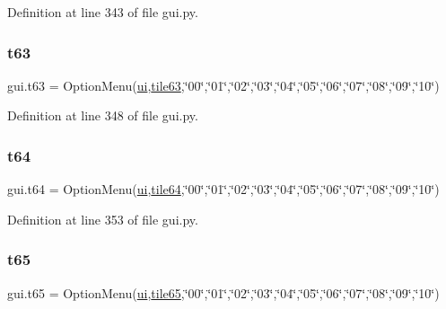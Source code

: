 Definition at line 343 of file gui.\+py.

\mbox{\label{namespacegui_a1aa84116c728e10eee4388bb757714c3}} 
\subsubsection{\texorpdfstring{t63}{t63}}
{\footnotesize\ttfamily gui.\+t63 = Option\+Menu(\mbox{\hyperlink{namespacegui_a40ab7281456eadbea2dc2038f5c24fa1}{ui}},\mbox{\hyperlink{namespacegui_ad42c2e1d85c862f7218f07791aad0d8a}{tile63}},\char`\"{}00\char`\"{},\char`\"{}01\char`\"{},\char`\"{}02\char`\"{},\char`\"{}03\char`\"{},\char`\"{}04\char`\"{},\char`\"{}05\char`\"{},\char`\"{}06\char`\"{},\char`\"{}07\char`\"{},\char`\"{}08\char`\"{},\char`\"{}09\char`\"{},\char`\"{}10\char`\"{})}



Definition at line 348 of file gui.\+py.

\mbox{\label{namespacegui_a153819d784faac94130fb5aa11c944d7}} 
\subsubsection{\texorpdfstring{t64}{t64}}
{\footnotesize\ttfamily gui.\+t64 = Option\+Menu(\mbox{\hyperlink{namespacegui_a40ab7281456eadbea2dc2038f5c24fa1}{ui}},\mbox{\hyperlink{namespacegui_a19cdc2ff759a4ddb510a64dee3011d9c}{tile64}},\char`\"{}00\char`\"{},\char`\"{}01\char`\"{},\char`\"{}02\char`\"{},\char`\"{}03\char`\"{},\char`\"{}04\char`\"{},\char`\"{}05\char`\"{},\char`\"{}06\char`\"{},\char`\"{}07\char`\"{},\char`\"{}08\char`\"{},\char`\"{}09\char`\"{},\char`\"{}10\char`\"{})}



Definition at line 353 of file gui.\+py.

\mbox{\label{namespacegui_a9918aaf5271447b2e374c6d6085a0a7a}} 
\subsubsection{\texorpdfstring{t65}{t65}}
{\footnotesize\ttfamily gui.\+t65 = Option\+Menu(\mbox{\hyperlink{namespacegui_a40ab7281456eadbea2dc2038f5c24fa1}{ui}},\mbox{\hyperlink{namespacegui_a16b2bd5f38987cf5d4e029ef779de240}{tile65}},\char`\"{}00\char`\"{},\char`\"{}01\char`\"{},\char`\"{}02\char`\"{},\char`\"{}03\char`\"{},\char`\"{}04\char`\"{},\char`\"{}05\char`\"{},\char`\"{}06\char`\"{},\char`\"{}07\char`\"{},\char`\"{}08\char`\"{},\char`\"{}09\char`\"{},\char`\"{}10\char`\"{})}



